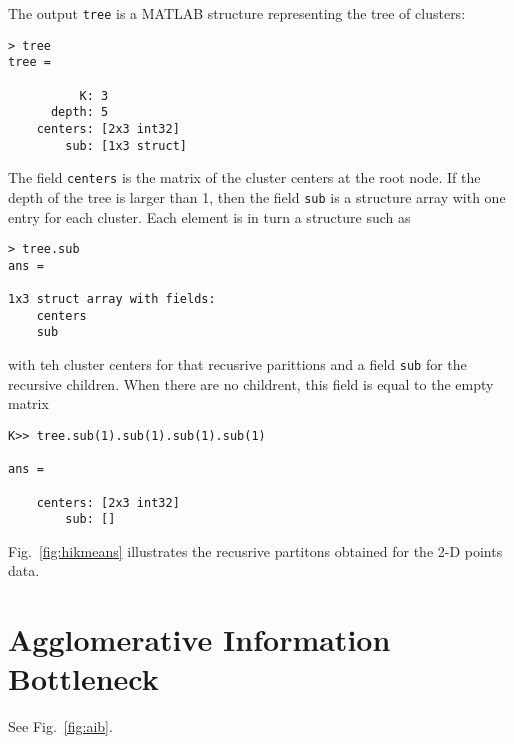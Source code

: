 \documentclass[9pt]{article}
\begin{document}
The output \verb$tree$ is a MATLAB structure representing the tree of
clusters:
\begin{verbatim}
> tree
tree =
 
          K: 3
      depth: 5
    centers: [2x3 int32]
        sub: [1x3 struct]
\end{verbatim}
The field \verb$centers$ is the matrix of the cluster centers at the
root node.  If the depth of the tree is larger than 1, then the field
\verb$sub$ is a structure array with one entry for each cluster. Each
element is in turn a structure such as
\begin{verbatim}
> tree.sub
ans = 

1x3 struct array with fields:
    centers
    sub
\end{verbatim}
with teh cluster centers for that recusrive parittions and a field
\verb$sub$ for the recursive children. When there are no childrent,
this field is equal to the empty matrix
\begin{verbatim}
K>> tree.sub(1).sub(1).sub(1).sub(1)

ans = 

    centers: [2x3 int32]
        sub: []
\end{verbatim}
Fig.~\ref{fig:hikmeans} illustrates the recusrive partitons obtained
for the 2-D points data.

\section{Agglomerative Information Bottleneck }\label{ikmeans}

See Fig.~\ref{fig:aib}.
\end{document}
